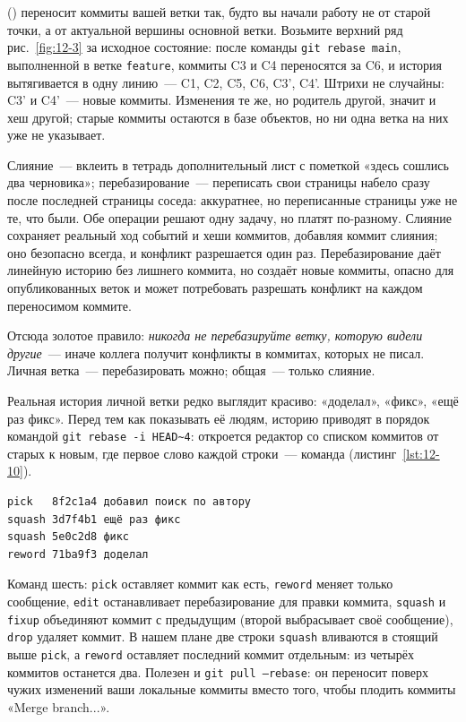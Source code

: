  () переносит коммиты вашей ветки так, будто вы начали работу не от старой точки, а от актуальной вершины основной ветки. Возьмите верхний ряд рис.~\ref{fig:12-3} за исходное состояние: после команды \texttt{git rebase main}, выполненной в ветке \texttt{feature}, коммиты C3 и C4 переносятся за C6, и история вытягивается в одну линию~--- C1, C2, C5, C6, C3', C4'. Штрихи не случайны: C3' и C4'~--- новые коммиты. Изменения те же, но родитель другой, значит и хеш другой; старые коммиты остаются в базе объектов, но ни одна ветка на них уже не указывает.

Слияние~--- вклеить в тетрадь дополнительный лист с пометкой «здесь сошлись два черновика»; перебазирование~--- переписать свои страницы набело сразу после последней страницы соседа: аккуратнее, но переписанные страницы уже не те, что были. Обе операции решают одну задачу, но платят по-разному. Слияние сохраняет реальный ход событий и хеши коммитов, добавляя коммит слияния; оно безопасно всегда, и конфликт разрешается один раз. Перебазирование даёт линейную историю без лишнего коммита, но создаёт новые коммиты, опасно для опубликованных веток и может потребовать разрешать конфликт на каждом переносимом коммите.

Отсюда золотое правило: \emph{никогда не перебазируйте ветку, которую видели другие}~--- иначе коллега получит конфликты в коммитах, которых не писал. Личная ветка~--- перебазировать можно; общая~--- только слияние.

Реальная история личной ветки редко выглядит красиво: «доделал», «фикс», «ещё
раз фикс». Перед тем как показывать её людям, историю приводят в порядок
командой \texttt{git rebase -i HEAD\textasciitilde 4}: откроется редактор со
списком коммитов от старых к новым, где первое слово каждой строки~--- команда
(листинг~\ref{lst:12-10}).

\begin{listing}[H]
\begin{verbatim}
pick   8f2c1a4 добавил поиск по автору
squash 3d7f4b1 ещё раз фикс
squash 5e0c2d8 фикс
reword 71ba9f3 доделал
\end{verbatim}
\caption{План интерактивного перебазирования}
\label{lst:12-10}
\end{listing}

Команд шесть: \texttt{pick} оставляет коммит как есть, \texttt{reword} меняет только сообщение, \texttt{edit} останавливает перебазирование для правки коммита, \texttt{squash} и \texttt{fixup} объединяют коммит с предыдущим (второй выбрасывает своё сообщение), \texttt{drop} удаляет коммит. В нашем плане две строки \texttt{squash} вливаются в стоящий выше \texttt{pick}, а \texttt{reword} оставляет последний коммит отдельным: из четырёх коммитов останется два. Полезен и \texttt{git pull --rebase}: он переносит поверх чужих изменений ваши локальные коммиты вместо того, чтобы плодить коммиты «Merge branch...».


